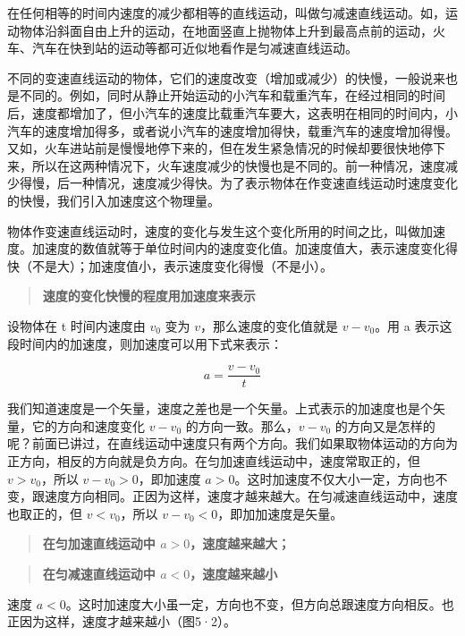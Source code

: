 在任何相等的时间内速度的减少都相等的直线运动，叫做匀减速直线运动。如，运动物体沿斜面自由上升的运动，在地面竖直上抛物体上升到最高点前的运动，火车、汽车在快到站的运动等都可近似地看作是匀减速直线运动。

不同的变速直线运动的物体，它们的速度改变（增加或减少）的快慢，一般说来也是不同的。例如，同时从静止开始运动的小汽车和载重汽车，在经过相同的时间后，速度都增加了，但小汽车的速度比载重汽车要大，这表明在相同的时间内，小汽车的速度增加得多，或者说小汽车的速度增加得快，载重汽车的速度增加得慢。又如，火车进站前是慢慢地停下来的，但在发生紧急情况的时候却要很快地停下来，所以在这两种情况下，火车速度减少的快慢也是不同的。前一种情况，速度减少得慢，后一种情况，速度减少得快。为了表示物体在作变速直线运动时速度变化的快慢，我们引入加速度这个物理量。

物体作变速直线运动时，速度的变化与发生这个变化所用的时间之比，叫做加速度。加速度的数值就等于单位时间内的速度变化值。加速度值大，表示速度变化得快（不是大）；加速度值小，表示速度变化得慢（不是小）。

\begin{quote}
\textbf{速度的变化快慢的程度用加速度来表示}
\end{quote}

设物体在 t 时间内速度由 \(v_{0}\) 变为 \(v\)，那么速度的变化值就是
\(v - v_{0}\)。用 a 表示这段时间内的加速度，则加速度可以用下式来表示：

\[
a = \frac {v - v _ {0}}{t} \tag{5.3}
\]

我们知道速度是一个矢量，速度之差也是一个矢量。上式表示的加速度也是个矢量，它的方向和速度变化
\(v - v_0\) 的方向一致。那么，\(v - v_0\)
的方向又是怎样的呢？前面已讲过，在直线运动中速度只有两个方向。我们如果取物体运动的方向为正方向，相反的方向就是负方向。在匀加速直线运动中，速度常取正的，但
\(v > v_0\)，所以 \(v - v_0 > 0\)，即加速度
\(a > 0\)。这时加速度不仅大小一定，方向也不变，跟速度方向相同。正因为这样，速度才越来越大。在匀减速直线运动中，速度也取正的，但
\(v < v_{0}\)，所以 \(v - v_{0} < 0\)，即加加速度是矢量。

\begin{quote}
\textbf{在匀加速直线运动中 \(a > 0\)，速度越来越大；}
\end{quote}

\begin{quote}
\textbf{在匀减速直线运动中 \(a < 0\)，速度越来越小}
\end{quote}

速度
\(a < 0\)。这时加速度大小虽一定，方向也不变，但方向总跟速度方向相反。也正因为这样，速度才越来越小（图5·2）。

